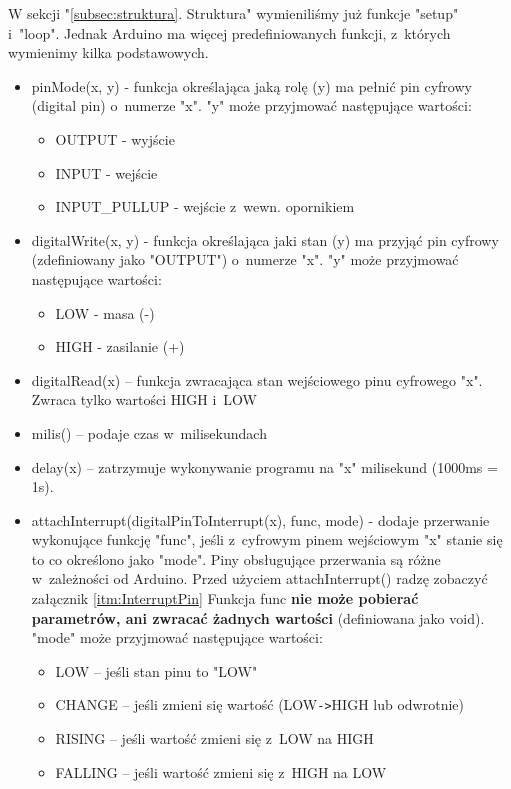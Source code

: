 \documentclass[a4paper,12pt, twoside]{article}
\begin{document}
	W sekcji "\ref{subsec:struktura}. Struktura" wymieniliśmy już funkcje "setup" i~"loop". Jednak Arduino ma więcej predefiniowanych funkcji, z~których wymienimy kilka podstawowych.
	\begin{itemize}
		\item pinMode(x, y) - funkcja określająca jaką rolę (y) ma pełnić pin cyfrowy (digital pin) o~numerze "x". "y" może przyjmować następujące wartości:
			\begin{itemize}
				\item OUTPUT - wyjście
				\item INPUT - wejście
				\item INPUT\_PULLUP - wejście z~wewn. opornikiem
			\end{itemize}
		\item digitalWrite(x, y) - funkcja określająca jaki stan (y) ma przyjąć pin cyfrowy (zdefiniowany jako "OUTPUT") o~numerze "x". "y" może przyjmować następujące wartości:
			\begin{itemize}
				\item LOW - masa (-)
				\item HIGH - zasilanie (+)
			\end{itemize}
		\item digitalRead(x) -- funkcja zwracająca stan wejściowego pinu cyfrowego "x". Zwraca tylko wartości HIGH i~LOW
		\item milis() -- podaje czas w~milisekundach
		\item delay(x) -- zatrzymuje wykonywanie programu na "x" milisekund (1000ms = 1s).
		\item attachInterrupt(digitalPinToInterrupt(x), func, mode) - dodaje przerwanie wykonujące funkcję "func", jeśli z~cyfrowym pinem wejściowym "x" stanie się to co określono jako "mode". Piny obsługujące przerwania są różne w~zależności od Arduino. Przed użyciem attachInterrupt() radzę zobaczyć załącznik \ref{itm:InterruptPin} Funkcja func \textbf{nie może pobierać parametrów, ani zwracać żadnych wartości} (definiowana jako void). "mode" może przyjmować następujące wartości:
			\begin{itemize}
				\item LOW -- jeśli stan pinu to "LOW"
				\item CHANGE -- jeśli zmieni się wartość (LOW\verb|->|HIGH lub odwrotnie)
				\item RISING -- jeśli wartość zmieni się z~LOW na HIGH
				\item FALLING -- jeśli wartość zmieni się z~HIGH na LOW
			\end{itemize}

\end{itemize}
\end{document}
